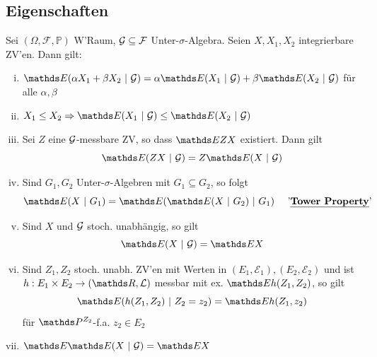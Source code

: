 \newpage

\subsection{Eigenschaften}
\label{sub:eigenschaften}
Sei $(\Omega,\mathcal{F},\mathds{P})$ W'Raum, $\mathcal{G}\subseteq \mathcal{F}$ Unter-$\sigma$-Algebra. 
Seien $X,X_1,X_2$ integrierbare ZV'en. Dann gilt:
\begin{enumerate}[(i)]
	\item $\E(\alpha X_1+\beta X_2~|~\G)=\alpha\E(X_1~|~\G)+\beta \E(X_2~|~\G)$ für alle $\alpha,\beta$
	\item $X_1\le X_2 \Rightarrow \E(X_1~|~\G)\le \E(X_2~|~\G)$
	\item Sei $Z$ eine $\mathcal{G}$-messbare ZV, so dass $\E ZX$ existiert. 
	Dann gilt 
	\[ 
	\E(ZX~|~\G)=Z\E(X~|~\G)
	\]
	\item Sind $G_1,G_2$ Unter-$\sigma$-Algebren mit $G_1\subseteq G_2$, so folgt 
	\[
	\E(X~|~G_1)=\E(\E(X~|~G_2)~|~G_1)\quad \text{ '\Index{Tower Property}'} 
	\]
	\item Sind $X$ und $\mathcal{G}$ stoch. unabhängig, so gilt 
	\[
	\E(X~|~\G)=\E X 
	\]
	\item Sind $Z_1,Z_2$ stoch. unabh. ZV'en mit Werten in $(E_1,\mathcal{E}_1),(E_2,\mathcal{E}_2)$ und ist $h:E_1\times E_2 \to (\R,\mathcal{L})$ messbar mit ex. $\E h(Z_1,Z_2)$, so gilt 
	\[
	\E(h(Z_1,Z_2)~|~Z_2=z_2)= \E h(Z_1,z_2)
	\]
	für $\Pw^{Z_2}$-f.a. $z_2\in E_2$
	\item $\E \E(X~|~\G)=\E X$
\end{enumerate}

